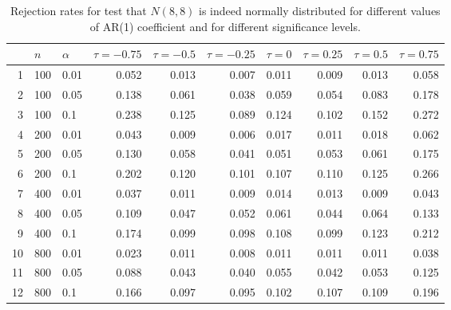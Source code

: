 \begin{table}[ht]
\centering
\caption{Rejection rates for test that $N(8, 8)$ is indeed
                   normally distributed for
                   different values of AR(1) coefficient and for different 
                   significance levels.} 
\label{table:rr_norm}
\begin{tabular}{rllrrrrrrr}
  \hline
 & $n$ & $\alpha$ & $\tau = -0.75$ & $\tau = -0.5$ & $\tau = -0.25$ & $\tau = 0$ & $\tau = 0.25$ & $\tau = 0.5$ & $\tau = 0.75$ \\ 
  \hline
1 & 100 & 0.01 & 0.052 & 0.013 & 0.007 & 0.011 & 0.009 & 0.013 & 0.058 \\ 
  2 & 100 & 0.05 & 0.138 & 0.061 & 0.038 & 0.059 & 0.054 & 0.083 & 0.178 \\ 
  3 & 100 & 0.1 & 0.238 & 0.125 & 0.089 & 0.124 & 0.102 & 0.152 & 0.272 \\ 
  4 & 200 & 0.01 & 0.043 & 0.009 & 0.006 & 0.017 & 0.011 & 0.018 & 0.062 \\ 
  5 & 200 & 0.05 & 0.130 & 0.058 & 0.041 & 0.051 & 0.053 & 0.061 & 0.175 \\ 
  6 & 200 & 0.1 & 0.202 & 0.120 & 0.101 & 0.107 & 0.110 & 0.125 & 0.266 \\ 
  7 & 400 & 0.01 & 0.037 & 0.011 & 0.009 & 0.014 & 0.013 & 0.009 & 0.043 \\ 
  8 & 400 & 0.05 & 0.109 & 0.047 & 0.052 & 0.061 & 0.044 & 0.064 & 0.133 \\ 
  9 & 400 & 0.1 & 0.174 & 0.099 & 0.098 & 0.108 & 0.099 & 0.123 & 0.212 \\ 
  10 & 800 & 0.01 & 0.023 & 0.011 & 0.008 & 0.011 & 0.011 & 0.011 & 0.038 \\ 
  11 & 800 & 0.05 & 0.088 & 0.043 & 0.040 & 0.055 & 0.042 & 0.053 & 0.125 \\ 
  12 & 800 & 0.1 & 0.166 & 0.097 & 0.095 & 0.102 & 0.107 & 0.109 & 0.196 \\ 
   \hline
\end{tabular}
\end{table}

